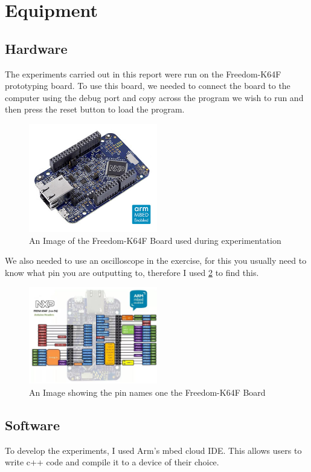 \documentclass[a4paper,12pt]{scrartcl}
\begin{document}
	\section{Equipment}
	{
		\subsection{Hardware}{
			The experiments carried out in this report were run on the Freedom-K64F prototyping board\cite{nxpproducts2014}. To use this board, we needed to connect the board to the computer using the debug port and copy across the program we wish to run and then press the reset button to load the program.
			\begin{figure}[h]
				\centering
				\includegraphics[width=0.5\textwidth]{FRDM-K64F-ANGLE}
				\caption{An Image of the Freedom-K64F Board used during experimentation\cite{nxpproducts2014}}
				\label{img:FRDM-K64F}
			\end{figure}
			We also needed to use an oscilloscope in the exercise, for this you usually need to know what pin you are outputting to, therefore I used \cref{img:pinout} to find this.
			\begin{figure}[h]
				\centering
				\includegraphics[width=0.5\textwidth]{frdm_k64f_reve4_header_pinout}
				\caption{An Image showing the pin names one the Freedom-K64F Board\cite{armlimited2015}}
				\label{img:pinout}
			\end{figure}
		}
		\subsection{Software}
		{
			To develop the experiments, I used Arm's mbed cloud IDE. This allows users to write c++ code and compile it to a device of their choice. 
		}
	}
	
\end{document}
